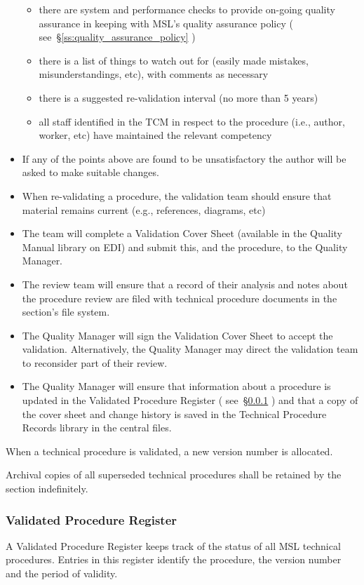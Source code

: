 \begin{itemize}
\begin{itemize}
\item there are system and performance checks to provide on-going quality assurance in keeping with MSL's quality assurance policy ( see~\S\ref{ss:quality_assurance_policy} )
\item there is a list of things to watch out for (easily made mistakes, misunderstandings, etc), with comments as necessary
\item there is a suggested re-validation interval (no more than 5 years)
\item all staff identified in the TCM in respect to the procedure (i.e., author, worker, etc) have maintained the relevant competency
\end{itemize}
\item If any of the points above are found to be unsatisfactory the author will be asked to make suitable changes.
\item When re-validating a procedure, the validation team should ensure that material remains current (e.g., references, diagrams, etc)
\item The team will complete a Validation Cover Sheet (available in the Quality Manual library on EDI) and submit this, and the procedure, to the Quality Manager. 
\item The review team will ensure that a record of their analysis and notes about the procedure review are filed with technical procedure documents in the section’s file system. 
\item The Quality Manager will sign the Validation Cover Sheet to accept the validation. Alternatively, the Quality Manager may direct the validation team to reconsider part of their review.
\item The Quality Manager will ensure that information about a procedure is updated in the Validated Procedure Register ( see~\S\ref{sss:validated_procedure_register} ) and that a copy of the cover sheet and change history is saved in the Technical Procedure Records library in the central files.
\end{itemize}

When a technical procedure is validated, a new version number is allocated. 

Archival copies of all superseded technical procedures shall be retained by the section indefinitely.

\subsubsection{Validated Procedure Register}
\label{sss:validated_procedure_register}
A Validated Procedure Register keeps track of the status of all MSL technical procedures. Entries in this register identify the procedure, the version number and the period of validity.

